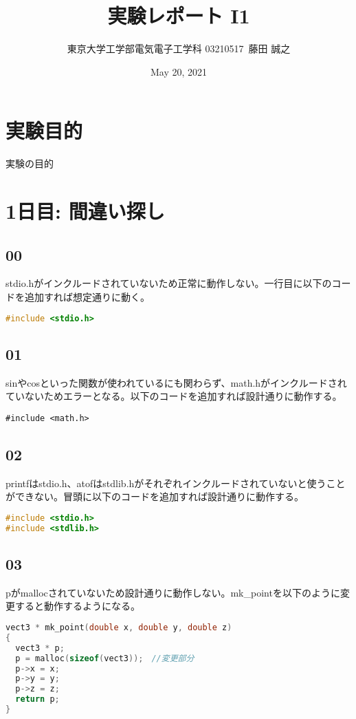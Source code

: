 \documentclass{ltjsarticle}
\title{実験レポート I1}
\author{東京大学工学部電気電子工学科 03210517\ 藤田 誠之 }
\date{ May 20, 2021}
\begin{document}
\maketitle
\section{実験目的}
実験の目的
\section{1日目: 間違い探し}
\subsection{00}
stdio.hがインクルードされていないため正常に動作しない。一行目に以下のコードを追加すれば想定通りに動く。
\begin{lstlisting}[caption=p00.c 変更部分,language=C]
#include <stdio.h>
\end{lstlisting}
\subsection{01}
sinやcosといった関数が使われているにも関わらず、math.hがインクルードされていないためエラーとなる。以下のコードを追加すれば設計通りに動作する。
\begin{lstlisting}[caption=p01.c 変更部分language=C]
#include <math.h>
\end{lstlisting}
\subsection{02}
printfはstdio.h、atofはstdlib.hがそれぞれインクルードされていないと使うことができない。冒頭に以下のコードを追加すれば設計通りに動作する。
\begin{lstlisting}[caption=p02.c 変更部分,language=C]
#include <stdio.h>
#include <stdlib.h>
\end{lstlisting}

\subsection{03}
pがmallocされていないため設計通りに動作しない。mk\_pointを以下のように変更すると動作するようになる。

\begin{lstlisting}[caption=p03.c 変更部分,language=C]
vect3 * mk_point(double x, double y, double z)
{
  vect3 * p;
  p = malloc(sizeof(vect3));　//変更部分
  p->x = x;
  p->y = y;
  p->z = z;
  return p;
}
\end{lstlisting}
\end{document}
